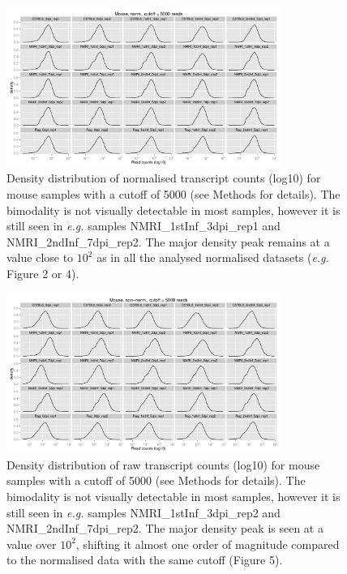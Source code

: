 \documentclass{article}
\begin{document}
\begin{figure}[h]
\begin{center}
\includegraphics[width=0.8\textwidth]{distributions_normmouse5000}
\caption{Density distribution of normalised transcript counts (log10)
  for mouse samples with a cutoff of 5000 (see Methods for
  details). The bimodality is not visually detectable in most samples,
  however it is still seen in \textit{e.g.} samples
  NMRI\_1stInf\_3dpi\_rep1 and NMRI\_2ndInf\_7dpi\_rep2. The major
  density peak remains at a value close to $10^2$ as in all the
  analysed normalised datasets (\textit{e.g.} Figure 2 or 4).}
\end{center}
\end{figure}

\begin{figure}[h]
\begin{center}
\includegraphics[width=0.8\textwidth]{distributions_mouse5000}
\caption{Density distribution of raw transcript counts (log10) for
  mouse samples with a cutoff of 5000 (see Methods for details). The
  bimodality is not visually detectable in most samples, however it is
  still seen in \textit{e.g.} samples NMRI\_1stInf\_3dpi\_rep2 and
  NMRI\_2ndInf\_7dpi\_rep2. The major density peak is seen at a value
  over $10^2$, shifting it almost one order of magnitude compared to
  the normalised data with the same cutoff (Figure 5).}
\end{center}
\end{figure}
\end{document}
